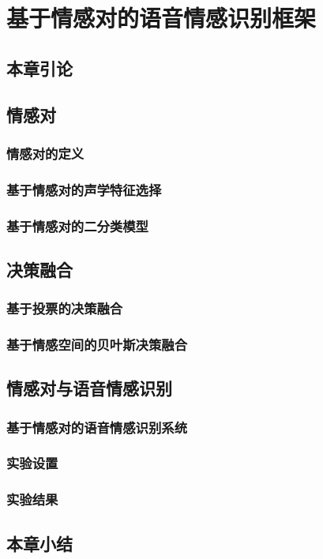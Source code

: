 \chapter{基于情感对的语音情感识别框架}

\section{本章引论}

\section{情感对}

\subsection{情感对的定义}

\subsection{基于情感对的声学特征选择}

\subsection{基于情感对的二分类模型}

\section{决策融合}

\subsection{基于投票的决策融合}

\subsection{基于情感空间的贝叶斯决策融合}

\section{情感对与语音情感识别}

\subsection{基于情感对的语音情感识别系统}

\subsection{实验设置}

\subsection{实验结果}

\section{本章小结}